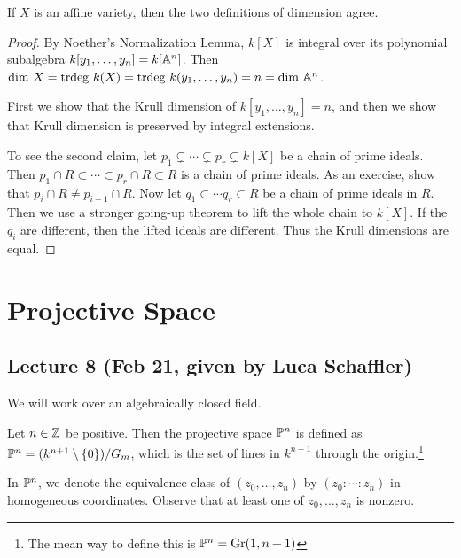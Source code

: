 \documentclass[twoside, 10pt]{article}
\begin{document}
    \begin{thm} If $X$ is an affine variety, then the two definitions of
        dimension agree.  \begin{proof} By Noether's Normalization Lemma,
            $k[X]$ is integral over its polynomial subalgebra $k[y_1, \ldots,
            y_n] = k[\A^n]$. Then $\mathrm{dim}\ X = \mathrm{trdeg}\ k(X) =
            \mathrm{trdeg}\ k(y_1, \ldots, y_n) = n = \mathrm{dim}\ \A^n$.

            First we show that the Krull dimension of $k[y_1, \ldots, y_n] =
            n$, and then we show that Krull dimension is preserved by integral
            extensions.

            To see the second claim, let $p_1 \subsetneq \cdots \subsetneq p_r
            \subsetneq k[X]$ be a chain of prime ideals. Then $p_1 \cap R
            \subset \cdots \subset p_r \cap R \subset R$ is a chain of prime
            ideals. As an exercise, show that $p_i \cap R \neq p_{i+1} \cap R$.
            Now let $q_1 \subset \cdots q_r \subset R$ be a chain of prime
            ideals in $R$. Then we use a stronger going-up theorem to lift the
            whole chain to $k[X]$. If the $q_i$ are different, then the lifted
        ideals are different. Thus the Krull dimensions are equal.  \end{proof}
    \end{thm}

    \section{Projective Space}
    
    \subsection{Lecture 8 (Feb 21, given by Luca Schaffler)}

    We will work over an algebraically closed field.

    \begin{defn} Let $n \in \Z$ be positive. Then the
        projective space $\P^n$ is defined as $\P^n = (k^{n+1} \setminus \{0\}
        ) / G_m$, which is the set of lines in $k^{n+1}$ through the
        origin.\footnote{The mean way to define this is $\P^n =
    \mathrm{Gr}(1,n+1)$} \end{defn}

    In $\P^n$, we denote the equivalence class of $(z_0, \ldots, z_n)$ by
    $(z_0:\cdots:z_n)$ in homogeneous coordinates. Observe that at least one of
    $z_0, \ldots, z_n$ is nonzero.
\end{document}
